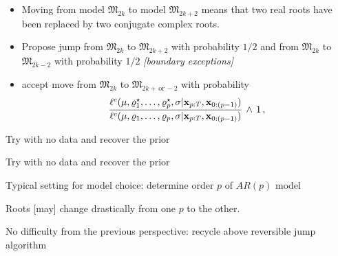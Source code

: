 \begin{slide}
\begin{itemize}
\item Moving from model $\mathfrak{M}_{2k}$ to model $\mathfrak{M}_{2k+2}$ means that
two real roots have been replaced by two conjugate complex roots.

\item Propose jump from $\mathfrak{M}_{2k}$ to 
$\mathfrak{M}_{2k+2}$ with probability $1/2$ and from 
$\mathfrak{M}_{2k}$ to $\mathfrak{M}_{2k-2}$ with probability
$1/2$ {\em [boundary exceptions]}

\item accept move from $\mathfrak{M}_{2k}$ to $\mathfrak{M}_{2k+\,\text{or}\,-2}$
with probability
$$
\frac{\ell^c(\mu,\varrho_1^\star,\ldots,\varrho_p^\star,\sigma|\mathbf{x}_{p:T},\mathbf{x}_{0:(p-1)})}
     {\ell^c(\mu,\varrho_1,\ldots,\varrho_p,\sigma|\mathbf{x}_{p:T},\mathbf{x}_{0:(p-1)})}\,\wedge\,1\,,
$$
\end{itemize}
\normalsize
\end{slide}\begin{slide}

Try with no data and recover the prior


\end{slide}\begin{slide}

Try with no data and recover the prior


\end{slide}\begin{slide}

Typical setting for model choice: determine order $p$ of $AR(p)$ model

Roots [may] change drastically from one $p$ to the other.

No difficulty from the previous perspective: recycle above reversible jump
algorithm


\end{slide}
